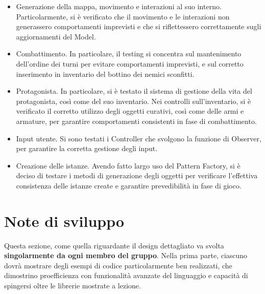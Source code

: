 \documentclass[a4paper,12pt]{report}
\begin{document}
\begin{itemize}
	\item Generazione della mappa, movimento e interazioni al suo interno. Particolarmente, si è verificato che il movimento e le interazioni non generassero comportamenti imprevisti e che si riflettessero correttamente sugli aggiornamenti del Model.
	\item Combattimento. In particolare, il testing si concentra sul mantenimento dell’ordine dei turni per evitare comportamenti imprevisti, e sul corretto inserimento in inventario del bottino dei nemici sconfitti.
	\item Protagonista. In particolare, si è testato il sistema di gestione della vita del protagonista, così come del suo inventario. Nei controlli sull’inventario, si è verificato il corretto utilizzo degli oggetti curativi, così come delle armi e armature, per garantire comportamenti consistenti in fase di combattimento.
	\item Input utente. Si sono testati i Controller che svolgono la funzione di Observer, per garantire la corretta gestione degli input.
	\item Creazione delle istanze. Avendo fatto largo uso del Pattern Factory, si è deciso di testare i metodi di generazione degli oggetti per verificare l’effettiva consistenza delle istanze create e garantire prevedibilità in fase di gioco.
\end{itemize}

\section{Note di sviluppo}

Questa sezione, come quella riguardante il design dettagliato va svolta \textbf{singolarmente da ogni membro del gruppo}.
%
Nella prima parte, ciascuno dovrà mostrare degli esempi di codice particolarmente ben realizzati,
che dimostrino proefficienza con funzionalità avanzate del linguaggio e capacità di spingersi oltre le librerie mostrate a lezione.
\end{document}

